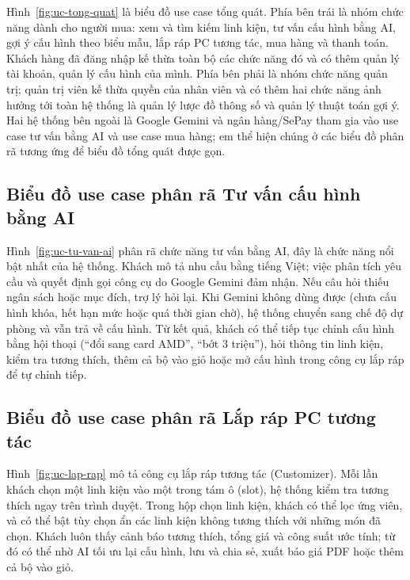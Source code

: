 
Hình~\ref{fig:uc-tong-quat} là biểu đồ use case tổng quát. Phía bên trái là nhóm chức năng dành cho người mua: xem và tìm kiếm linh kiện, tư vấn cấu hình bằng AI, gợi ý cấu hình theo biểu mẫu, lắp ráp PC tương tác, mua hàng và thanh toán. Khách hàng đã đăng nhập kế thừa toàn bộ các chức năng đó và có thêm quản lý tài khoản, quản lý cấu hình của mình. Phía bên phải là nhóm chức năng quản trị; quản trị viên kế thừa quyền của nhân viên và có thêm hai chức năng ảnh hưởng tới toàn hệ thống là quản lý lược đồ thông số và quản lý thuật toán gợi ý. Hai hệ thống bên ngoài là Google Gemini và ngân hàng/SePay tham gia vào use case tư vấn bằng AI và use case mua hàng; em thể hiện chúng ở các biểu đồ phân rã tương ứng để biểu đồ tổng quát được gọn.

\subsection{Biểu đồ use case phân rã Tư vấn cấu hình bằng AI}


Hình~\ref{fig:uc-tu-van-ai} phân rã chức năng tư vấn bằng AI, đây là chức năng nổi bật nhất của hệ thống. Khách mô tả nhu cầu bằng tiếng Việt; việc phân tích yêu cầu và quyết định gọi công cụ do Google Gemini đảm nhận. Nếu câu hỏi thiếu ngân sách hoặc mục đích, trợ lý hỏi lại. Khi Gemini không dùng được (chưa cấu hình khóa, hết hạn mức hoặc quá thời gian chờ), hệ thống chuyển sang chế độ dự phòng và vẫn trả về cấu hình. Từ kết quả, khách có thể tiếp tục chỉnh cấu hình bằng hội thoại (``đổi sang card AMD'', ``bớt 3 triệu''), hỏi thông tin linh kiện, kiểm tra tương thích, thêm cả bộ vào giỏ hoặc mở cấu hình trong công cụ lắp ráp để tự chỉnh tiếp.

\subsection{Biểu đồ use case phân rã Lắp ráp PC tương tác}


Hình~\ref{fig:uc-lap-rap} mô tả công cụ lắp ráp tương tác (Customizer). Mỗi lần khách chọn một linh kiện vào một trong tám ô (slot), hệ thống kiểm tra tương thích ngay trên trình duyệt. Trong hộp chọn linh kiện, khách có thể lọc ứng viên, và có thể bật tùy chọn ẩn các linh kiện không tương thích với những món đã chọn. Khách luôn thấy cảnh báo tương thích, tổng giá và công suất ước tính; từ đó có thể nhờ AI tối ưu lại cấu hình, lưu và chia sẻ, xuất báo giá PDF hoặc thêm cả bộ vào giỏ.

